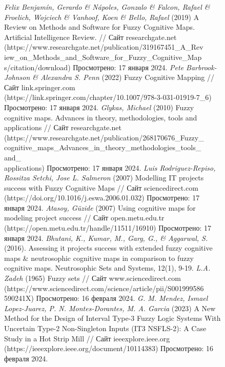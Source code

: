\documentclass{article}
\begin{document}
    \begin{figure}[!t]
        \fontsize{8}{7}\selectfont
        \begin{minipage}{0.49\textwidth}
            \begin{thebibliography}{}
                 \textit{Felix Benjamín, Gerardo \& Nápoles, Gonzalo \& Falcon, Rafael \& Froelich, Wojciech \& Vanhoof, Koen \& Bello, Rafael} (2019) A Review on Methods and Software for Fuzzy Cognitive Maps. Artificial Intelligence Review. // Сайт researchgate.net (https://www.researchgate.net/publication/319167451\_A\_Rev\\iew\_on\_Methods\_and\_Software\_for\_Fuzzy\_Cognitive\_Map\\s/citation/download) Просмотрено: 17 января 2024.
                 \textit{Pete Barbrook-Johnson \& Alexandra S. Penn} (2022) Fuzzy Cognitive Mapping // Сайт link.springer.com (https://link.springer.com/chapter/10.1007/978-3-031-01919-7\_6) Просмотрено: 17 января 2024.
                 \textit{Glykas, Michael} (2010) Fuzzy cognitive maps. Advances in theory, methodologies, tools and applications // Сайт researchgate.net (https://www.researchgate.net/publication/268170676\_Fuzzy\_\\cognitive\_maps\_Advances\_in\_theory\_methodologies\_tools\_\\and\_\\applications) Просмотрено: 17 января 2024.
                 \textit{Luis Rodriguez-Repiso, Rossitza Setchi, Jose L. Salmeron} (2007) Modelling IT projects success with Fuzzy Cognitive Maps // Сайт sciencedirect.com (https://doi.org/10.1016/j.eswa.2006.01.032) Просмотрено: 17 января 2024.
                 \textit{Atasoy, Güzide} (2007) Using cognitive maps for modeling project success // Сайт open.metu.edu.tr (https://open.metu.edu.tr/handle/11511/16910) Просмотрено: 17 января 2024.
                 \textit{Bhutani, K., Kumar, M., Garg, G., \& Aggarwal, S.} (2016). Assessing it projects success with extended fuzzy cognitive maps \& neutrosophic cognitive maps in comparison to fuzzy cognitive maps. Neutrosophic Sets and Systems, 12(1), 9-19.
                 \textit{L.A. Zadeh} (1965) Fuzzy sets // Сайт www.sciencedirect.com (https://www.sciencedirect.com/science/article/pii/S001999586\\590241X) Просмотрено: 16 февраля 2024.
                 \textit{G. M. Mendez, Ismael Lopez-Juarez, P. N. Montes-Dorantes, M. A. Garcia} (2023) A New Method for the Design of Interval Type-3 Fuzzy Logic Systems With Uncertain Type-2 Non-Singleton Inputs (IT3 NSFLS-2): A Case Study in a Hot Strip Mill // Сайт ieeexplore.ieee.org (https://ieeexplore.ieee.org/document/10114383) Просмотрено: 16 февраля 2024.

\end{thebibliography}
\end{minipage}
\end{figure}
\end{document}
